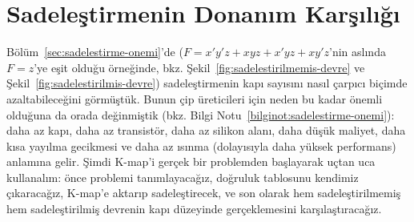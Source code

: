 \section{Sadeleştirmenin Donanım Karşılığı}\label{sec:kmap-donanim-karsiligi}
Bölüm~\ref{sec:sadelestirme-onemi}'de ($F=x'y'z+xyz+x'yz+xy'z$'nin aslında $F=z$'ye eşit
olduğu örneğinde, bkz. Şekil~\ref{fig:sadelestirilmemis-devre} ve
Şekil~\ref{fig:sadelestirilmis-devre}) sadeleştirmenin kapı sayısını nasıl çarpıcı biçimde
azaltabileceğini görmüştük. Bunun çip üreticileri için neden bu kadar önemli olduğuna da
orada değinmiştik (bkz. Bilgi Notu~\ref{bilginot:sadelestirme-onemi}): daha az kapı, daha
az transistör, daha az silikon alanı, daha düşük maliyet, daha kısa yayılma gecikmesi ve
daha az ısınma (dolayısıyla daha yüksek performans) anlamına gelir. Şimdi K-map'i gerçek
bir problemden başlayarak uçtan uca kullanalım: önce problemi tanımlayacağız, doğruluk
tablosunu kendimiz çıkaracağız, K-map'e aktarıp sadeleştirecek, ve son olarak hem
sadeleştirilmemiş hem sadeleştirilmiş devrenin kapı düzeyinde gerçeklemesini
karşılaştıracağız.

